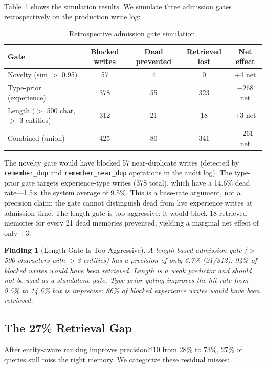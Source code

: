 \documentclass[11pt]{article}
\newtheorem{finding}{Finding}
\begin{document}
Table~\ref{tab:gates} shows the simulation results. We simulate three admission gates retrospectively on the production write log:

\begin{table}[h]
\centering
\caption{Retrospective admission gate simulation.}
\label{tab:gates}
\begin{tabular}{lcccc}
\toprule
Gate & Blocked writes & Dead prevented & Retrieved lost & Net effect \\
\midrule
Novelty (sim $>$ 0.95) & 57 & 4 & 0 & +4 net \\
Type-prior (experience) & 378 & 55 & 323 & $-268$ net \\
Length ($>$ 500 char, $>$ 3 entities) & 312 & 21 & 18 & +3 net \\
\midrule
Combined (union) & 425 & 80 & 341 & $-261$ net \\
\bottomrule
\end{tabular}
\end{table}

The novelty gate would have blocked 57 near-duplicate writes (detected by \texttt{remember\_dup} and \texttt{remember\_near\_dup} operations in the audit log). The type-prior gate targets experience-type writes (378 total), which have a 14.6\% dead rate---1.5$\times$ the system average of 9.5\%. This is a base-rate argument, not a precision claim: the gate cannot distinguish dead from live experience writes at admission time. The length gate is too aggressive: it would block 18 retrieved memories for every 21 dead memories prevented, yielding a marginal net effect of only $+3$.

\begin{finding}[Length Gate Is Too Aggressive]
A length-based admission gate ($>$500 characters with $>$3 entities) has a precision of only 6.7\% (21/312): 94\% of blocked writes would have been retrieved. Length is a weak predictor and should not be used as a standalone gate. Type-prior gating improves the hit rate from 9.5\% to 14.6\% but is imprecise: 86\% of blocked experience writes would have been retrieved.
\end{finding}

\subsection{The 27\% Retrieval Gap}

After entity-aware ranking improves precision@10 from 28\% to 73\%, 27\% of queries still miss the right memory. We categorize these residual misses:
\end{document}

